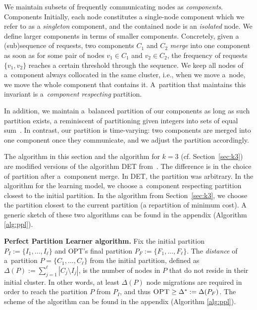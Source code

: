 \documentclass[a4paper,anonymous,USenglish]{lipics-v2019}
\newcommand{\OPT}{\textsc{OPT}\xspace}
\begin{document}
We maintain subsets of frequently communicating nodes as \emph{components}.
Components 
Initially,
each node constitutes a single-node component which we refer to as a \emph{singleton} component, 
and the contained node is an \emph{isolated} node.
We define larger components in terms of smaller components.
Concretely,
given a (sub)sequence of requests,
two components $C_1$ and $C_2$
 \emph{merge} into one component as soon as
 for some pair of nodes $v_1 \in C_1$ and $v_2 \in C_2$,
the frequency of requests $\{v_1,v_2\}$ reaches a certain threshold through the sequence.
We keep all nodes of a~component always collocated in the same cluster,
i.e., when we  move a~node,
we move the whole component that contains it.
A~partition that maintains this invariant is a~\emph{component respecting} partition.

In addition,
we maintain a~balanced partition of our components as long as such partition exists,
a reminiscent of partitioning given integers into sets of equal sum~\cite{integer-partitions-book}.
In contrast, our partition is time-varying:  two components are merged into one component once they communicate, and we adjust the partition accordingly.


\medskip

The algorithm in this section and the algorithm for $k=3$ (cf. Section~\ref{sec:k3}) are modified versions of the algorithm DET from~\cite{repartition-disc}.
The difference is in the choice of partition after a~component merge.
In DET, the partition was arbitrary.
In the algorithm for the learning model,
we choose a~component respecting partition closest to the initial partition.
In the algorithm from Section~\ref{sec:k3}, we choose the partition closest to the current partition (a repartition of minimum cost).
A generic sketch of these two algorithms can be found in the appendix (Algorithm \ref{alg:ppl}).

\noindent
\textbf{Perfect Partition Learner algorithm.}
Fix the initial partition
$P_I :=\{ I_1, \dots, I_{\ell}\}$ and \OPT's final partition
$P_F := \{F_1, \dots, F_{\ell}\}$.
The \emph{distance} of a~partition
 $P = \{C_1, \dots, C_{\ell}\}$ from the initial partition,
defined as 
$\Delta(P) := \sum_{j=1}^{\ell} | C_j \setminus I_j |$,
 is the number of nodes in $P$ that do not reside in their initial cluster.
In other words,
at least $\Delta(P)$ node migrations are required in order to reach the partition $P$ from $P_I$, and thus
$\OPT \geq \Delta^*:= \Delta(P_F) $.
The scheme of the algorithm can be found in the  appendix (Algorithm \ref{alg:ppl}).
\end{document}
